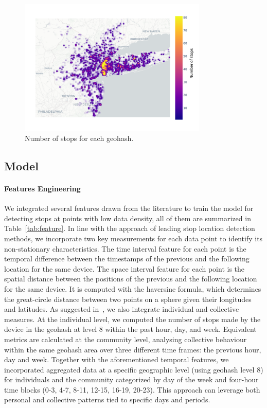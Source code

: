 \documentclass{article}
\begin{document}
\begin{figure}[ht]
    \includegraphics[width=0.8\textwidth]{./Images/heatmap_geohash_all_users.png}
	\centering
	\caption{Number of stops for each geohash.}
	\label{fig:fig_geohash_heatmap}
\end{figure}




\subsection{Model}

\paragraph{Features Engineering}
We integrated several features drawn from the literature to train the model for detecting stops at points with low data density, all of them are summarized in Table~\ref{tab:feature}.
In line with the approach of leading stop location detection methods, we incorporate two key measurements for each data point to identify its non-stationary characteristics.
The time interval feature for each point is the temporal difference between the timestamps of the previous and the following location for the same device.
The space interval feature for each point is the spatial distance between the positions of the previous and the following location for the same device. It is computed with the haversine formula, which determines the great-circle distance between two points on a sphere given their longitudes and latitudes. 
As suggested in~\citep{Bontorin2024a}, we also integrate individual and collective measures.
At the individual level, we computed the number of stops made by the device in the geohash at level 8 within the past hour, day, and week.
Equivalent metrics are calculated at the community level, analysing collective behaviour within the same geohash area over three different time frames: the previous hour, day and week.
Together with the aforementioned temporal features, we incorporated aggregated data at a specific geographic level (using geohash level 8) for individuals and the community categorized by day of the week and four-hour time blocks (0-3, 4-7, 8-11, 12-15, 16-19, 20-23).
This approach can leverage both personal and collective patterns tied to specific days and periods.
\end{document}

